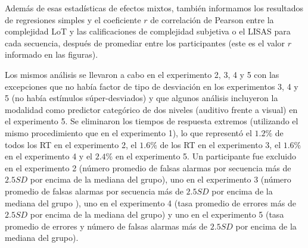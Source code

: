 
Además de esas estadísticas de efectos mixtos, también informamos los resultados de regresiones simples y el coeficiente $r$ de correlación de Pearson entre la complejidad LoT y las calificaciones de complejidad subjetiva o el LISAS para cada secuencia, después de promediar entre los participantes (este es el valor $r$ informado en las figuras). %


Los mismos análisis se llevaron a cabo en el experimento 2, 3, 4 y 5 con las excepciones que no había factor de tipo de desviación en los experimentos 3, 4 y 5 (no había estímulos súper-desviados) y que algunos análisis incluyeron la modalidad como predictor categórico de dos niveles (auditivo frente a visual) en el experimento 5. Se eliminaron los tiempos de respuesta extremos (utilizando el mismo procedimiento que en el experimento 1), lo que representó el $1.2\%$ de todos los RT en el experimento 2, el $1.6\%$ de los RT en el experimento 3, el $1.6\%$ en el experimento 4 y el $2.4\%$ en el experimento 5. Un participante fue excluido en el experimento 2 (número promedio de falsas alarmas por secuencia más de $2.5 SD$ por encima de la mediana del grupo), uno en el experimento 3 (número promedio de falsas alarmas por secuencia más de $2.5 SD$ por encima de la mediana del grupo ), uno en el experimento 4 (tasa promedio de errores más de $2.5 SD$ por encima de la mediana del grupo) y uno en el experimento 5 (tasa promedio de errores y número de falsas alarmas más de $2.5 SD$ por encima de la mediana del grupo).


